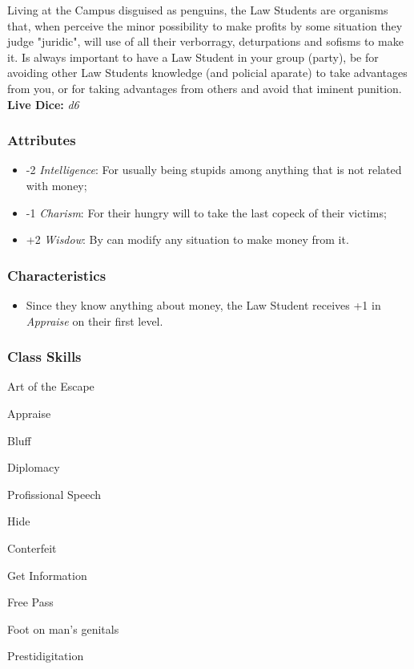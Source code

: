 \documentclass[ letterpaper,12pt]{article}
\begin{document}
Living at the Campus disguised as penguins, the Law Students are organisms
that, when perceive the minor possibility to make profits by some situation
they judge "juridic", will use of all their verborragy, deturpations and
sofisms to make it. Is always important to have a Law Student in your group
(party), be for avoiding other Law Students knowledge (and policial aparate) to
take advantages from you, or for taking advantages from others and avoid that
iminent punition.\\

{\bf Live Dice:} {\it d6}

\subsubsection{Attributes}
\begin{itemize}
\item{-2 {\it Intelligence}: For usually being stupids among anything that is not related with money;}
\item{-1 {\it Charism}: For their hungry will to take the last copeck of their victims;}
\item{+2 {\it Wisdow}: By can modify any situation to make money from it.}
\end{itemize}

\subsubsection{Characteristics}

\begin{itemize}
\item{Since they know anything about money, the Law Student receives +1 in {\it Appraise} on their first level.}
\end{itemize}

\subsubsection{Class Skills}
\begin{itemize}
{\it
\item{Art of the Escape}
\item{Appraise}
\item{Bluff}
\item{Diplomacy}
\item{Profissional Speech}
\item{Hide}
\item{Conterfeit}
\item{Get Information}
\item{Free Pass}
\item{Foot on man's genitals}
\item{Prestidigitation}
}
\end{itemize}
\end{document}
